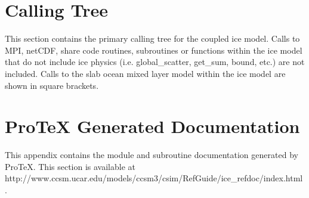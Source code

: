 \documentclass[]{article}
\begin{document}





\appendix 
\section {Calling Tree}
\label{calling_tree}

This section contains the primary calling tree for the coupled ice model. Calls
to MPI, netCDF, share code routines, subroutines or functions within the ice model
that do not include ice physics (i.e. global\_scatter, get\_sum, bound, etc.) are
not included.  Calls to the slab ocean mixed layer model within the ice model are
shown in square brackets.



\section {ProTeX Generated Documentation}

This appendix contains the module and subroutine documentation generated by ProTeX.
This section is available at \\
http://www.ccsm.ucar.edu/models/ccsm3/csim/RefGuide/ice\_refdoc/index.html .

\end{document}
